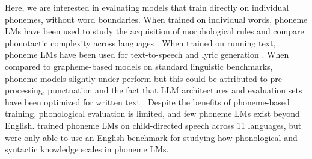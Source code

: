 


Here, we are interested in evaluating models that train directly on individual phonemes, without word boundaries. When trained on individual words, phoneme LMs have been used to study the acquisition of morphological rules \citep{kirov-2018-recurrent} and compare phonotactic complexity across languages \citep{pimentel2020phonotactic}. When trained on running text, phoneme LMs have been used for text-to-speech \citep{li-2023-phoneme-level-bert} and lyric generation \citep{ding-2024-songcomposer}. When compared to grapheme-based models on standard linguistic benchmarks, phoneme models slightly under-perform \citep{nguyen-2022-word-boundaries, bunzeck2024graphemes} but this could be attributed to pre-processing, punctuation and the fact that LLM architectures and evaluation sets have been optimized for written text \citep{goriely2024babble}. Despite the benefits of phoneme-based training, phonological evaluation is limited, and few phoneme LMs exist beyond English. \citet{goriely2025} trained phoneme LMs on child-directed speech across 11 languages, but were only able to use an English benchmark for studying how phonological and syntactic knowledge scales in phoneme LMs. 



